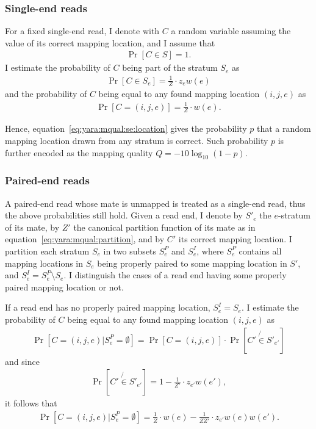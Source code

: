 \subsubsection{Single-end reads}

For a fixed single-end read, I denote with $C$ a random variable assuming the value of its correct mapping location, and I assume that
\begin{eqnarray}
\Pr[C \in S] = 1.
\end{eqnarray}
I estimate the probability of $C$ being part of the stratum $S_e$ as
\begin{eqnarray}
\label{eq:yara:mqual:se:stratum}
\Pr[C \in S_e] = \frac{1}{Z} \cdot z_e w(e)
\end{eqnarray}
and the probability of $C$ being equal to any found mapping location $(i,j,e)$ as
\begin{eqnarray}
\label{eq:yara:mqual:se:location}
\Pr[C = (i,j,e)] = \frac{1}{Z} \cdot w(e).
\end{eqnarray}


Hence, equation~\ref{eq:yara:mqual:se:location} gives the probability $p$ that a random mapping location drawn from any stratum is correct.
Such probability $p$ is further encoded as the mapping quality $Q=-10 \log_{10}(1-p)$.

\subsubsection{Paired-end reads}

A paired-end read whose mate is unmapped is treated as a single-end read, thus the above probabilities still hold.
Given a read end, I denote by $S'_e$ the $e$-stratum of its mate, by $Z'$ the canonical partition function of its mate as in equation~\ref{eq:yara:mqual:partition}, and by $C'$ its correct mapping location.
I partition each stratum $S_e$ in two subsets $S^P_e$ and $S^I_e$, where $S^P_e$ contains all mapping locations in $S_e$ being properly paired to some mapping location in $S'$, and $S^I_e = S^P_e \setminus S_e$.
I distinguish the cases of a read end having some properly paired mapping location or not.

If a read end has no properly paired mapping location, $S^I_e = S_e$.
I estimate the probability of $C$ being equal to any found mapping location $(i,j,e)$ as
\begin{eqnarray}
\Pr[C = (i,j,e) | S^P_e = \emptyset] = \Pr[C = (i,j,e)] \cdot \Pr[C' \not{\in} S'_{e'}]
\end{eqnarray}
and since
\begin{eqnarray}
\Pr[C' \not{\in} S'_{e'}] = 1 - \frac{1}{Z'} \cdot z_{e'} w(e'),
\end{eqnarray}
it follows that
\begin{eqnarray}
\label{eq:yara:mqual:pe:location}
\Pr[C = (i,j,e) | S^P_e = \emptyset] = \frac{1}{Z} \cdot w(e) - \frac{1}{ZZ'} \cdot z_{e'} w(e) w(e').
\end{eqnarray}


